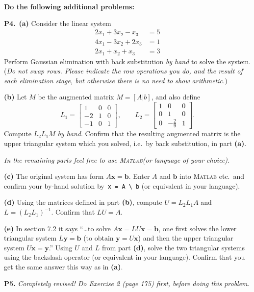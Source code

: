\documentclass[12pt]{amsart}
\newcommand{\bb}{\mathbf{b}}
\newcommand{\bx}{\mathbf{x}}
\newcommand{\by}{\mathbf{y}}
\newcommand{\Matlab}{\textsc{Matlab}\xspace}
\newcommand{\prob}[1]{\bigskip\noindent\textbf{#1.}\quad }
\newcommand{\epart}[1]{\medskip\noindent\textbf{(#1)}\quad }
\newcommand{\ppart}[1]{\,\textbf{(#1)}\quad }
\begin{document}
\bigskip
\noindent \textbf{Do the following additional problems:}

\prob{P4}  \ppart{a}  Consider the linear system
\begin{align*}
2 x_1 + 3 x_2 - x_3 &= 5 \\
4 x_1 - 3 x_2 + 2 x_3 &= 1 \\
2 x_1 + x_2 + x_3 &= 3
\end{align*}
Perform Gaussian elimination with back substitution \emph{by hand} to solve the system.  (\emph{Do not swap rows.  Please indicate the row operations you do, and the result of each elimination stage, but otherwise there is no need to show arithmetic.})

\epart{b}  Let $M$ be the augmented matrix $M = \left[A \big| b\right]$, and also define
  $$L_1 = \begin{bmatrix}
  1 & 0 & 0 \\ -2 & 1 & 0 \\ -1 & 0 & 1
  \end{bmatrix}, \qquad
  L_2 = \begin{bmatrix}
  1 & 0 & 0 \\ 0 & 1 & 0 \\ 0 & -\frac{2}{9} & 1
  \end{bmatrix}.$$
Compute $L_2 L_1 M$ \emph{by hand}.  Confirm that the resulting augmented matrix is the upper triangular system which you solved, i.e.~by back substitution, in part \textbf{(a)}.

\medskip
\noindent \emph{In the remaining parts feel free to use \Matlab (or language of your choice).}

\epart{c}  The original system has form $A \bx = \bb$.  Enter $A$ and $\bb$ into \Matlab etc.~and confirm your by-hand solution by \,\verb|x = A \ b| (or equivalent in your language).

\epart{d}  Using the matrices defined in part \textbf{(b)}, compute $U=L_2 L_1 A$ and $L = (L_2 L_1)^{-1}$.  Confirm that $LU=A$.

\epart{e}  In section 7.2 it says ``\dots to solve $A\bx = LU\bx = \bb$, one first solves the lower triangular system $L\by = \bb$ (to obtain $\by = U\bx$) and then the upper triangular system $U\bx=\by$.''  Using $U$ and $L$ from part \textbf{(d)}, solve the two triangular systems using the backslash operator (or equivalent in your language).  Confirm that you get the same answer this way as in \textbf{(a)}.


\prob{P5}  \emph{{\color{BrickRed} Completely revised!}  Do Exercise 2 (page 175) first, before doing this problem.}
\end{document}
